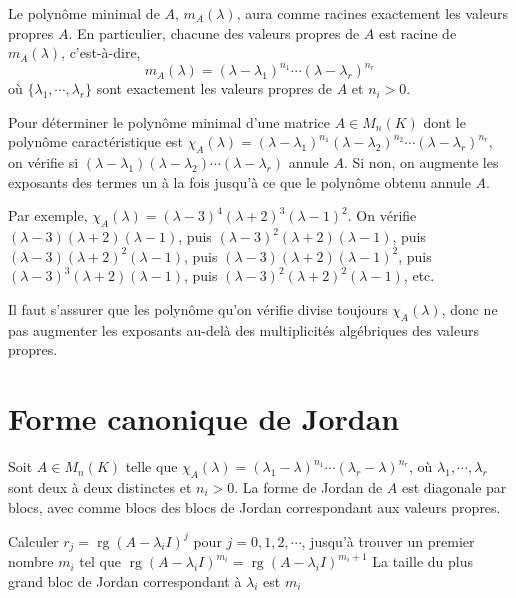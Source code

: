 \documentclass{article}
\begin{document}
	Le polyn\^ome minimal de $A$, $m_A(\lambda)$, aura comme racines exactement les valeurs propres $A$. En particulier, chacune des valeurs propres de $A$ est racine de $m_A(\lambda)$, c'est-\`a-dire, \[ m_A(\lambda) = (\lambda-\lambda_1)^{n_1} \dotsb (\lambda-\lambda_r)^{n_r} \] o\`u $\{\lambda_1, \dotsb, \lambda_r\}$ sont exactement les valeurs propres de $A$ et $n_i>0$.
	
	Pour d\'eterminer le polyn\^ome minimal d'une matrice $A \in M_n(K)$ dont le polyn\^ome caract\'eristique est $\chi_A(\lambda) = (\lambda-\lambda_1)^{n_1} (\lambda-\lambda_2)^{n_2} \dotsb (\lambda-\lambda_r)^{n_r}$, on v\'erifie si $(\lambda-\lambda_1) (\lambda-\lambda_2) \dotsb (\lambda-\lambda_r)$ annule $A$. Si non, on augmente les exposants des termes un \`a la fois jusqu'\`a ce que le polyn\^ome obtenu annule $A$.
	
	Par exemple, $\chi_A(\lambda) = (\lambda-3)^4 (\lambda+2)^3 (\lambda-1)^2$. On v\'erifie $(\lambda-3) (\lambda+2) (\lambda-1)$, puis $(\lambda-3)^2 (\lambda+2) (\lambda-1)$, puis $(\lambda-3) (\lambda+2)^2 (\lambda-1)$, puis $(\lambda-3) (\lambda+2) (\lambda-1)^2$, puis $(\lambda-3)^3 (\lambda+2) (\lambda-1)$, puis $(\lambda-3)^2 (\lambda+2)^2 (\lambda-1)$, etc.
	
	Il faut s'assurer que les polyn\^ome qu'on v\'erifie divise toujours $\chi_A(\lambda)$, donc ne pas augmenter les exposants au-del\`a des multiplicit\'es alg\'ebriques des valeurs propres.
	
	\section{Forme canonique de Jordan}
	Soit $A \in M_n(K)$ telle que $\chi_A(\lambda) = (\lambda_1-\lambda)^{n_1} \dotsb (\lambda_r-\lambda)^{n_r}$, o\`u $\lambda_1, \dotsb, \lambda_r$ sont deux \`a deux distinctes et $n_i>0$. La forme de Jordan de $A$ est diagonale par blocs, avec comme blocs des blocs de Jordan correspondant aux valeurs propres.
	
	\begin{algorithm}[H]
		\caption{Proc\'edure pour trouver les blocs de Jordan correspondant \`a $\lambda_i$}
		
		\BlankLine
		Calculer $r_j = \operatorname{rg}(A-\lambda_iI)^j$ pour $j = 0, 1, 2, \dotsb$, jusqu'\`a trouver un premier nombre $m_i$ tel que $\operatorname{rg}(A-\lambda_iI)^{m_i} = \operatorname{rg}(A-\lambda_iI)^{m_i+1}$\;
		La taille du plus grand bloc de Jordan correspondant \`a $\lambda_i$ est $m_i$\;
	\end{algorithm}
	
\end{document}
